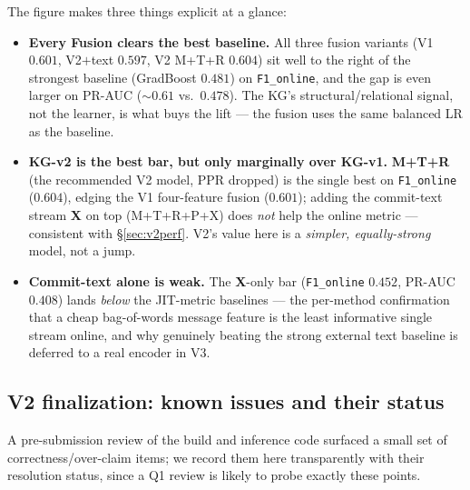 \documentclass[11pt,a4paper]{article}
\newcommand{\code}[1]{\texttt{#1}}
\begin{document}
	The figure makes three things explicit at a glance:
	\begin{itemize}[nosep]
		\item \textbf{Every Fusion clears the best baseline.} All three fusion
		variants (V1 $0.601$, V2$+$text $0.597$, V2 M+T+R $0.604$) sit well to the
		right of the strongest baseline (GradBoost $0.481$) on \code{F1\_online}, and
		the gap is even larger on PR-AUC ($\sim$$0.61$ vs.\ $0.478$). The KG's
		structural/relational signal, not the learner, is what buys the lift --- the
		fusion uses the same balanced LR as the baseline.
		\item \textbf{KG-v2 is the best bar, but only marginally over KG-v1.}
		\textbf{M+T+R} (the recommended V2 model, PPR dropped) is the single best on
		\code{F1\_online} ($0.604$), edging the V1 four-feature fusion ($0.601$);
		adding the commit-text stream \textbf{X} on top (M+T+R+P+X) does \emph{not}
		help the online metric --- consistent with \S\ref{sec:v2perf}. V2's value here
		is a \emph{simpler, equally-strong} model, not a jump.
		\item \textbf{Commit-text alone is weak.} The \textbf{X}-only bar
		(\code{F1\_online} $0.452$, PR-AUC $0.408$) lands \emph{below} the JIT-metric
		baselines --- the per-method confirmation that a cheap bag-of-words message
		feature is the least informative single stream online, and why genuinely
		beating the strong external text baseline is deferred to a real encoder in V3.
	\end{itemize}

	\subsection{V2 finalization: known issues and their status}\label{sec:v2finalize}
	A pre-submission review of the build and inference code surfaced a small set of
	correctness/over-claim items; we record them here transparently with their
	resolution status, since a Q1 review is likely to probe exactly these points.
\end{document}
